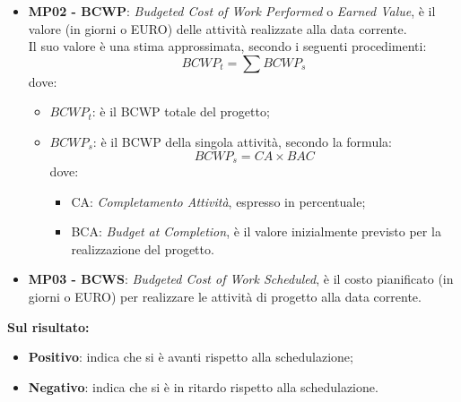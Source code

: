 		\begin{itemize}
			\item {\bfseries MP02 - BCWP}: {\itshape Budgeted Cost of Work Performed} o {\itshape
			Earned Value}, è  il valore (in giorni o EURO) delle attività realizzate alla data corrente.\\
			Il suo valore è una stima approssimata, secondo i seguenti procedimenti:
			\begin{displaymath}
				BCWP_t = \sum BCWP_s
			\end{displaymath}
			dove:
			\begin{itemize}
				\item {\bfseries $BCWP_t$}: è il BCWP totale del progetto;
				\item {\bfseries $BCWP_s$}: è il BCWP della singola attività, secondo la formula:
				\begin{displaymath}
					BCWP_s = CA\times BAC
				\end{displaymath}
			dove:
			\begin{itemize}
				\item  CA: {\itshape Completamento Attività}, espresso in percentuale;
				\item BCA: {\itshape Budget at Completion}, è il valore inizialmente previsto per la realizzazione del progetto.
			\end{itemize}
			\end{itemize}
			\item {\bfseries MP03 - BCWS}: {\itshape Budgeted Cost of Work Scheduled}, è il costo pianificato (in giorni o EURO) per realizzare le attività di progetto alla data corrente. \\
		\end{itemize} 
		
		{\bfseries Sul risultato:}
		\begin{itemize}
		\item {\bfseries Positivo}: indica che si è avanti rispetto alla schedulazione;
		\item {\bfseries Negativo}: indica che si è in ritardo rispetto alla schedulazione.\\
		\end{itemize}
